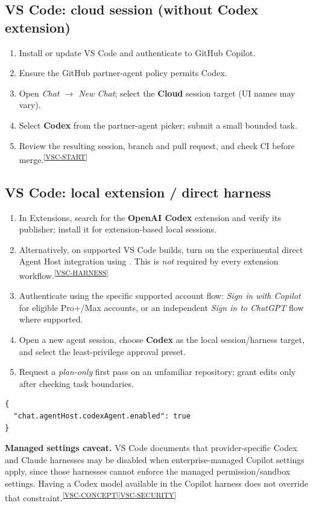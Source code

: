 \documentclass[11pt,letterpaper,oneside]{article}
\newcommand{\cmd}[1]{\path{#1}}
\newcommand{\src}[1]{\textsuperscript{\hyperref[ref:#1]{[#1]}}}
\begin{document}
\subsection{VS Code: cloud session (without Codex extension)}
\begin{enumerate}
\item Install or update VS Code and authenticate to GitHub Copilot.
\item Ensure the GitHub partner-agent policy permits Codex.
\item Open \emph{Chat $\rightarrow$ New Chat}; select the \textbf{Cloud} session target (UI names may vary).
\item Select \textbf{Codex} from the partner-agent picker; submit a small bounded task.
\item Review the resulting session, branch and pull request, and check CI before merge.\src{VSC-START}
\end{enumerate}

\subsection{VS Code: local extension / direct harness}
\begin{enumerate}
\item In Extensions, search for the \textbf{OpenAI Codex} extension and verify its publisher; install it for extension-based local sessions.
\item Alternatively, on supported VS Code builds, turn on the experimental direct Agent Host integration using \cmd{chat.agentHost.codexAgent.enabled}. This is \emph{not} required by every extension workflow.\src{VSC-HARNESS}
\item Authenticate using the specific supported account flow: \emph{Sign in with Copilot} for eligible Pro+/Max accounts, or an independent \emph{Sign in to ChatGPT} flow where supported.
\item Open a new agent session, choose \textbf{Codex} as the local session/harness target, and select the least-privilege approval preset.
\item Request a \emph{plan-only} first pass on an unfamiliar repository; grant edits only after checking task boundaries.
\end{enumerate}
\begin{lstlisting}[style=jsonstyle,caption={Illustrative VS Code settings.json fragment for supported direct Agent Host builds.}]
{
  "chat.agentHost.codexAgent.enabled": true
}
\end{lstlisting}
\begin{riskbox}
\textbf{Managed settings caveat.} VS Code documents that provider-specific Codex and Claude harnesses may be disabled when enterprise-managed Copilot settings apply, since those harnesses cannot enforce the managed permission/sandbox settings. Having a Codex model available in the Copilot harness does not override that constraint.\src{VSC-CONCEPT}\src{VSC-SECURITY}
\end{riskbox}
\end{document}
